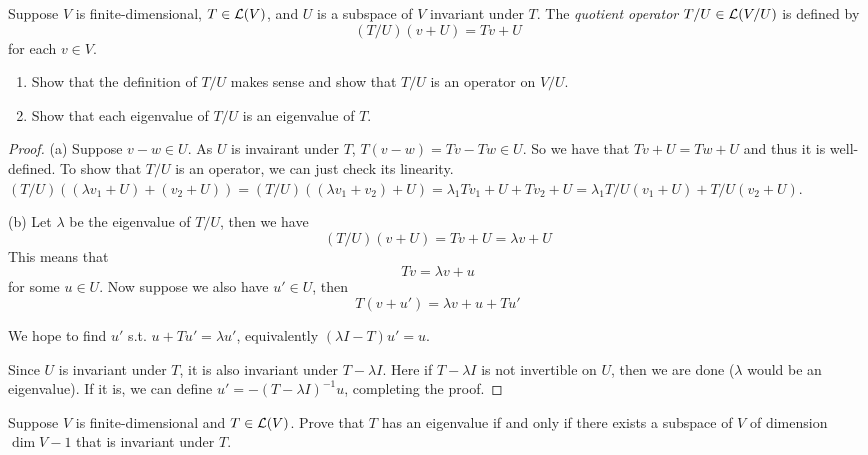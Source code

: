 \documentclass{extarticle}
\begin{document}
\begin{problem}{38}
    Suppose \(V\) is finite-dimensional, \(T \in \mathcal{L}(V)\), and \(U\) is a subspace 
    of \(V\) invariant under \(T\). The \emph{quotient operator} \(T/U \in \mathcal{L}(V/U)\) 
    is defined by 
    \[(T/U)(v + U) = Tv + U\]
    for each \(v \in V\). 
    \begin{enumerate}[label=(\alph*)]
        \item Show that the definition of \(T/U\) makes sense and show that \(T/U\) is an operator 
        on \(V/U\).
        \item Show that each eigenvalue of \(T/U\) is an eigenvalue of \(T\). 
    \end{enumerate}
\end{problem}

\begin{proof}
(a) Suppose \(v - w \in U\). As \(U\) is invairant under \(T\), \(T(v - w) = Tv - Tw \in U\). 
So we have that \(Tv + U = Tw + U\) and thus it is well-defined. To show that \(T/U\) is an operator, 
we can just check its linearity. \((T/U)( (\lambda v_1 + U) + (v_2 + U)  ) 
= (T/U)((\lambda v_1 + v_2) + U) = \lambda_1 Tv_1 + U + T v_2 + U = \lambda_1 T/U(v_1 + U) 
+ T/U (v_2 + U)\). 

(b) Let \(\lambda\) be the eigenvalue of \(T/U\), then we have 
\[(T/U)(v+U) = Tv + U = \lambda v + U\]
This means that 
\[Tv = \lambda v + u\]
for some \(u \in U\). Now suppose we also have \(u' \in U\), then 
\[T(v + u') = \lambda v + u + Tu'\]

We hope to find \(u'\) s.t. \(u + Tu' = \lambda u'\), equivalently \((\lambda I - T)u' = u\).

Since \(U\) is invariant under \(T\), it is also invariant under \(T - \lambda I\). Here 
if \(T - \lambda I\) is not invertible on \(U\), then we are done (\(\lambda\) would be 
an eigenvalue). If it is, we can define \(u' = -(T - \lambda I)^{-1}u\), completing the proof.

\end{proof}


\begin{problem}{39}
    Suppose \(V\) is finite-dimensional and \(T \in \mathcal{L}(V)\). Prove that \(T\) has an eigenvalue 
    if and only if there exists a subspace of \(V\) of dimension \(\dim V -1\) that is invariant 
    under \(T\).
\end{problem}
\end{document}
